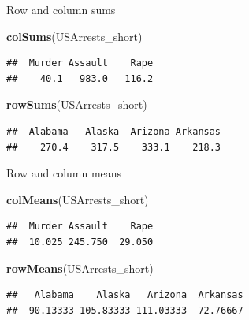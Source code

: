\documentclass[ignorenonframetext,]{beamer}
\newenvironment{Shaded}{\begin{snugshade}}{\end{snugshade}}
\newcommand{\KeywordTok}[1]{\textcolor[rgb]{0.13,0.29,0.53}{\textbf{#1}}}
\newcommand{\NormalTok}[1]{#1}
\begin{document}
\begin{frame}[fragile]{Row and column sums}
\protect\hypertarget{row-and-column-sums}{}

\begin{Shaded}
\begin{Highlighting}[]
\KeywordTok{colSums}\NormalTok{(USArrests_short) }
\end{Highlighting}
\end{Shaded}

\begin{verbatim}
##  Murder Assault    Rape 
##    40.1   983.0   116.2
\end{verbatim}

\begin{Shaded}
\begin{Highlighting}[]
\KeywordTok{rowSums}\NormalTok{(USArrests_short) }
\end{Highlighting}
\end{Shaded}

\begin{verbatim}
##  Alabama   Alaska  Arizona Arkansas 
##    270.4    317.5    333.1    218.3
\end{verbatim}

\end{frame}

\begin{frame}[fragile]{Row and column means}
\protect\hypertarget{row-and-column-means}{}

\begin{Shaded}
\begin{Highlighting}[]
\KeywordTok{colMeans}\NormalTok{(USArrests_short) }
\end{Highlighting}
\end{Shaded}

\begin{verbatim}
##  Murder Assault    Rape 
##  10.025 245.750  29.050
\end{verbatim}

\begin{Shaded}
\begin{Highlighting}[]
\KeywordTok{rowMeans}\NormalTok{(USArrests_short) }
\end{Highlighting}
\end{Shaded}

\begin{verbatim}
##   Alabama    Alaska   Arizona  Arkansas 
##  90.13333 105.83333 111.03333  72.76667
\end{verbatim}

\end{frame}
\end{document}
